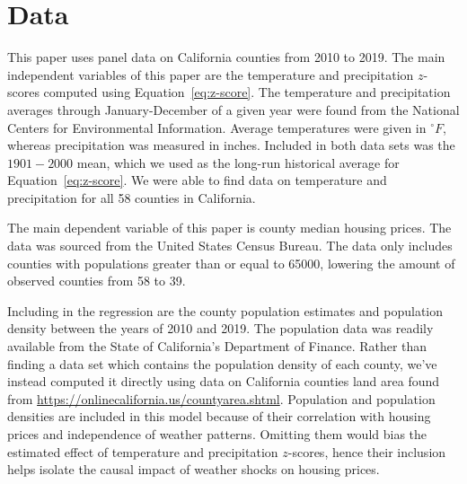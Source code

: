 \documentclass[12pt,reqno]{amsart}
\theoremstyle{definition}
\begin{document}
\section{Data}\label{sec:Data}

    This paper uses panel data on California counties from 2010 to 2019. The main independent variables of this paper are the temperature and precipitation $z$-scores computed using Equation~\ref{eq:z-score}. The temperature and precipitation averages through January-December of a given year were found from the National Centers for Environmental Information. Average temperatures were given in $^{\circ}F$, whereas precipitation was measured in inches. Included in both data sets was the $1901-2000$ mean, which we used as the long-run historical average for Equation~\ref{eq:z-score}. We were able to find data on temperature and precipitation for all 58 counties in California.

    The main dependent variable of this paper is county median housing prices. The data was sourced from the United States Census Bureau. The data only includes counties with populations greater than or equal to 65000, lowering the amount of observed counties from 58 to 39.

    Including in the regression are the county population estimates and population density between the years of 2010 and 2019. The population data was readily available from the State of California's Department of Finance. Rather than finding a data set which contains the population density of each county, we've instead computed it directly using data on California counties land area found from \url{https://onlinecalifornia.us/countyarea.shtml}. Population and population densities are included in this model because of their correlation with housing prices and independence of weather patterns. Omitting them would bias the estimated effect of temperature and precipitation $z$-scores, hence their inclusion helps isolate the causal impact of weather shocks on housing prices.
\end{document}
